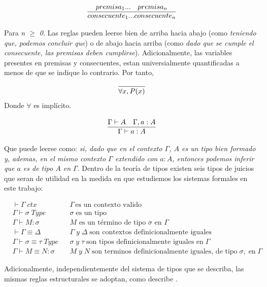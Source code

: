 \documentclass[a4paper,12pt]{report}
\theoremstyle{definition}
\theoremstyle{plain}
\theoremstyle{remark}
\begin{document}
\begin{align}
\infer{consecuente_1 ... consecuente_n}{%
    premisa_1
    ...
    & \deduce{premisa_n}{}
  }
\end{align}

Para \textit{n $\geq$ 0}. Las reglas pueden leerse bien de arriba hacia abajo (como \textit{teniendo que, podemos concluir que}) o de abajo hacia arriba (como \textit{dado que se cumple el consecuente, las premisas deben cumplirse}). Adicionalmente, las variables presentes en premisas y consecuentes, estan universialmente quantificadas a menos de que se indique lo contrario. Por tanto,

\begin{align}
\infer{\forall x, P(x)}{}
\end{align}
Donde $\forall$ es implícito.

\begin{align}
\infer{\Gamma \vdash a : A}{%
    \Gamma \vdash A
    & \deduce{\Gamma, a : A}{}
  }
\end{align}

Que puede leerse como: \textit{si, dado que en el contexto $\Gamma$, $A$ es un tipo bien formado y, ademas, en el mismo contexto $\Gamma$ extendido con $a : A$, entonces podemos inferir que $a$ es de tipo $A$ en $\Gamma$}.
\newline
\newline
\indent Dentro de la teoría de tipos existen seis tipos de juicios que seran de utilidad en la medida en que estudiemos los sistemas formales en este trabajo:

\begin{align*}
&\vdash \Gamma \; ctx && \Gamma\, \text{es un contexto valido}\\
&\Gamma \vdash \sigma\; Type && \sigma\; \text{es un tipo}\\
&\Gamma \vdash M : \sigma && \text{$M$ es un término de tipo $\sigma$ en $\Gamma$}\\
&\vdash \Gamma \equiv \Delta && \Gamma \; y\; \Delta\; \text{son contextos definicionalmente iguales}\\
&\Gamma \vdash \sigma \equiv \tau\; Type && \sigma\; y\; \tau\; \text{son tipos definicionalmente iguales en}\; \Gamma\\
&\Gamma \vdash M \equiv N : \sigma && M\; y\; N\; \text{son terminos definicionalmente iguales, de tipo}\; \sigma,\;\text{en}\; \Gamma
\end{align*}

Adicionalmente, independientemente del sistema de tipos que se describa, las mismas reglas estructurales se adoptan, como describe \citealp{hoffman2009}.
\end{document}
